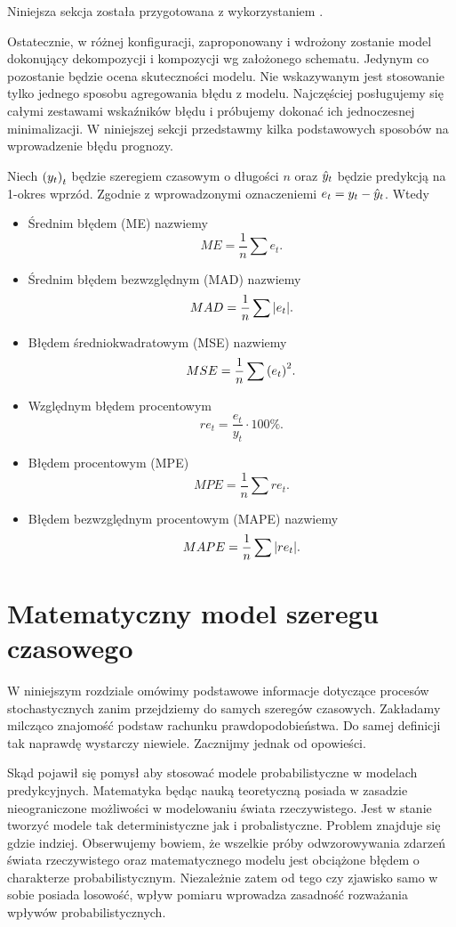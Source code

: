 \documentclass[10pt,a4paper]{book}
\begin{document}
Niniejsza sekcja została przygotowana z wykorzystaniem \citep{montgomery2015introduction}.

Ostatecznie, w różnej konfiguracji, zaproponowany i wdrożony zostanie model dokonujący dekompozycji i kompozycji wg założonego schematu. Jedynym co pozostanie będzie ocena skuteczności modelu. Nie wskazywanym jest stosowanie tylko jednego sposobu agregowania błędu z modelu. Najczęściej posługujemy się całymi zestawami wskaźników błędu i próbujemy dokonać ich jednoczesnej minimalizacji. W niniejszej sekcji przedstawmy kilka podstawowych sposobów na wprowadzenie błędu prognozy.

\begin{definition}
Niech $\left( {y_t} \right)_{t}^{} $ będzie szeregiem czasowym  o długości $n$ oraz $\predict{y}{t}$ będzie predykcją na 1-okres wprzód. Zgodnie z wprowadzonymi oznaczeniemi $e_t = y_t - \predict{y}{t}$. Wtedy
\begin{itemize}
\item Średnim błędem (ME) nazwiemy 
$$
ME = \frac{1}{n} \sum  e_t.
$$
\item Średnim błędem bezwzględnym (MAD) nazwiemy 
$$
MAD = \frac{1}{n} \sum  \abs{e_t}.
$$
\item Błędem średniokwadratowym (MSE) nazwiemy 
$$
MSE = \frac{1}{n} \sum  \bracket{e_t}^2.
$$
\item Względnym błędem procentowym 
$$
re_t = \frac{e_t}{y_t} \cdot 100 \%.
$$
\item Błędem procentowym (MPE) 
$$
MPE = \frac{1}{n} \sum  re_t.
$$
\item Błędem bezwzględnym procentowym (MAPE) nazwiemy 
$$
MAPE = \frac{1}{n} \sum  \abs{re_t} .
$$
\end{itemize}
\end{definition}

\chapter{Matematyczny model szeregu czasowego}

W niniejszym rozdziale omówimy podstawowe informacje dotyczące procesów stochastycznych zanim przejdziemy do samych szeregów czasowych. Zakładamy milcząco znajomość podstaw rachunku prawdopodobieństwa. Do samej definicji tak naprawdę wystarczy niewiele. Zacznijmy jednak od opowieści.

Skąd pojawił się pomysł aby stosować modele probabilistyczne w modelach predykcyjnych. Matematyka będąc nauką teoretyczną posiada w zasadzie nieograniczone możliwości w modelowaniu świata rzeczywistego. Jest w stanie tworzyć modele tak deterministyczne jak i probalistyczne. Problem znajduje się gdzie indziej. Obserwujemy bowiem, że wszelkie próby odwzorowywania zdarzeń świata rzeczywistego oraz matematycznego modelu jest obciążone błędem o charakterze probabilistycznym. Niezależnie zatem od tego czy zjawisko samo w sobie posiada losowość, wpływ pomiaru wprowadza zasadność rozważania wpływów probabilistycznych.
\end{document}
